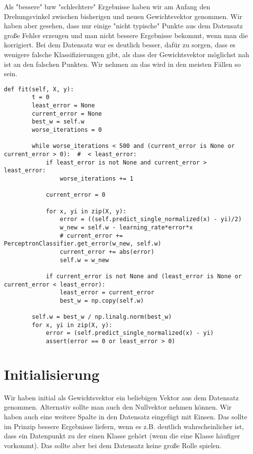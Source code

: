 Als "bessere" bzw "schlechtere" Ergebnisse haben wir am Anfang den Drehungsvinkel zwischen bisherigen und
neuen Gewichtsvektor genommen. Wir haben aber gesehen, dass nur einige "nicht typische" Punkte aus dem Datensatz
große Fehler erzeugen und man nicht bessere Ergebnisse bekommt, wenn man die korrigiert. Bei dem Datensatz war es
deutlich besser, dafür zu sorgen, dass es wenigere falsche Klassifizierungen gibt, als dass der Gewichtsvektor möglichst
nah ist an den falschen Punkten. Wir nehmen an das wird in den meisten Fällen so sein.
\begin{lstlisting}[style=py]
    def fit(self, X, y):
        t = 0
        least_error = None
        current_error = None
        best_w = self.w
        worse_iterations = 0

        while worse_iterations < 500 and (current_error is None or current_error > 0):  #  < least_error:
            if least_error is not None and current_error > least_error:
                worse_iterations += 1

            current_error = 0

            for x, yi in zip(X, y):
                error = ((self.predict_single_normalized(x) - yi)/2)
                w_new = self.w - learning_rate*error*x
                # current_error += PerceptronClassifier.get_error(w_new, self.w)
                current_error += abs(error)
                self.w = w_new

            if current_error is not None and (least_error is None or current_error < least_error):
                least_error = current_error
                best_w = np.copy(self.w)

        self.w = best_w / np.linalg.norm(best_w)
        for x, yi in zip(X, y):
            error = (self.predict_single_normalized(x) - yi)
            assert(error == 0 or least_error > 0)

\end{lstlisting}


\section*{Initialisierung}
Wir haben initial als Gewichtsvektor ein beliebigen Vektor aus dem Datensatz genommen. Alternativ sollte man auch den
Nullvektor nehmen können. Wir haben auch eine weitere Spalte in den Datensatz eingefügt mit Einsen. Das sollte im
Prinzip bessere Ergebnisse liefern, wenn es z.B. deutlich wahrscheinlicher ist, dass ein Datenpunkt zu der einen
Klasse gehört (wenn die eine Klasse häufiger vorkommt). Das sollte aber bei dem Datensatz keine große Rolle spielen.

